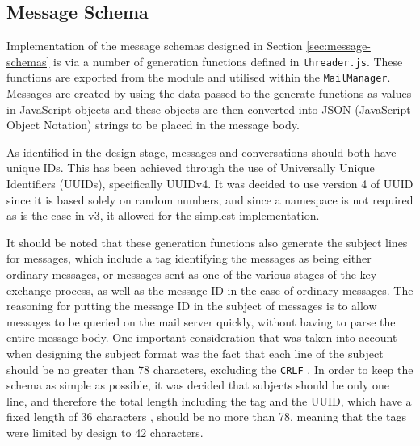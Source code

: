 \subsection{Message Schema}\label{sec:message-schema-implementation}
Implementation of the message schemas designed in Section \ref{sec:message-schemas} is via a number of generation functions defined in \verb|threader.js|. These functions are exported from the module and utilised within the \verb|MailManager|. Messages are created by using the data passed to the generate functions as values in  JavaScript objects and these objects are then converted into JSON (JavaScript Object Notation) strings to be placed in the message body. 

As identified in the design stage, messages and conversations should both have unique IDs. This has been achieved through the use of Universally Unique Identifiers (UUIDs), specifically UUIDv4. It was decided to use version 4 of UUID since it is based solely on random numbers, and since a namespace is not required as is the case in v3, it allowed for the simplest implementation.

It should be noted that these generation functions also generate the subject lines for messages, which include a tag identifying the messages as being either ordinary messages, or messages sent as one of the various stages of the key exchange process, as well as the message ID in the case of ordinary messages. The reasoning for putting the message ID in the subject of messages is to allow messages to be queried on the mail server quickly, without having to parse the entire message body. One important consideration that was taken into account when designing the subject format was the fact that each line of the subject should be no greater than 78 characters, excluding the \verb|CRLF| \cite{internet-message-format-rfc}. In order to keep the schema as simple as possible, it was decided that subjects should be only one line, and therefore the total length including the tag and the UUID, which have a fixed length of 36 characters \cite{uuid-rfc}, should be no more than 78, meaning that the tags were limited by design to 42 characters.